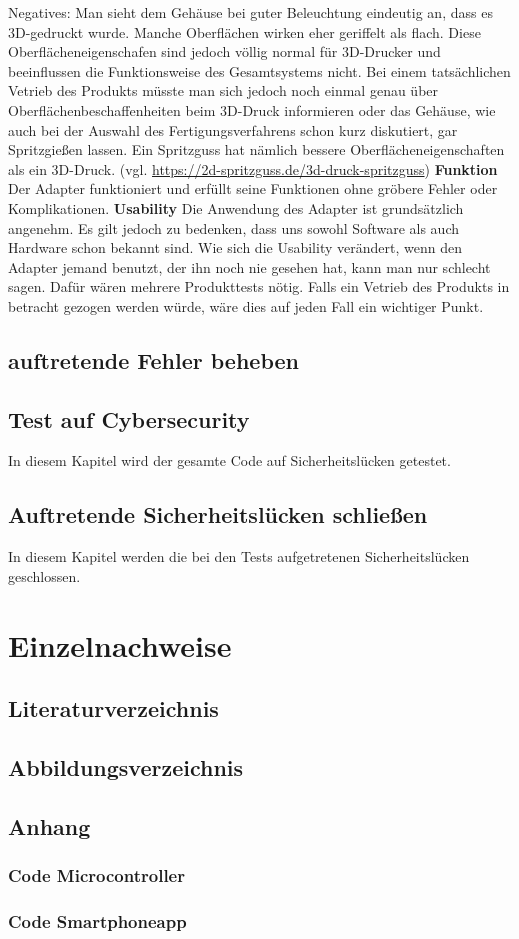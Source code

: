 \documentclass[]{article}
\begin{document}
Negatives:\newline
Man sieht dem Gehäuse bei guter Beleuchtung eindeutig an, dass es 3D-gedruckt wurde. Manche Oberflächen wirken eher geriffelt als flach. Diese Oberflächeneigenschafen sind jedoch völlig normal für 3D-Drucker und beeinflussen die Funktionsweise des Gesamtsystems nicht. Bei einem tatsächlichen Vetrieb des Produkts müsste man sich jedoch noch einmal genau über Oberflächenbeschaffenheiten beim 3D-Druck informieren oder das Gehäuse, wie auch bei der Auswahl des Fertigungsverfahrens schon kurz diskutiert, gar Spritzgießen lassen. Ein Spritzguss hat nämlich bessere Oberflächeneigenschaften als ein 3D-Druck.
\vspace{4mm}\newline
(vgl. \url{https://2d-spritzguss.de/3d-druck-spritzguss})
\vspace{4mm}\newline
\textbf{Funktion}\newline
Der Adapter funktioniert und erfüllt seine Funktionen ohne gröbere Fehler oder Komplikationen.
\vspace{4mm}\newline
\textbf{Usability}\newline
Die Anwendung des Adapter ist grundsätzlich angenehm. Es gilt jedoch zu bedenken, dass uns sowohl Software als auch Hardware schon bekannt sind. Wie sich die Usability verändert, wenn den Adapter jemand benutzt, der ihn noch nie gesehen hat, kann man nur schlecht sagen. Dafür wären mehrere Produkttests nötig. Falls ein Vetrieb des Produkts in betracht gezogen werden würde, wäre dies auf jeden Fall ein wichtiger Punkt.
\subsection{auftretende Fehler beheben}
\subsection{Test auf Cybersecurity}
In diesem Kapitel wird der gesamte Code auf Sicherheitslücken getestet.
\subsection{Auftretende Sicherheitslücken schließen}
In diesem Kapitel werden die bei den Tests aufgetretenen Sicherheitslücken geschlossen.

\section{Einzelnachweise}
\subsection{Literaturverzeichnis}
\subsection{Abbildungsverzeichnis}
\listoffigures
\subsection{Anhang}
\subsubsection{Code Microcontroller}
\subsubsection{Code Smartphoneapp}
\end{document}
